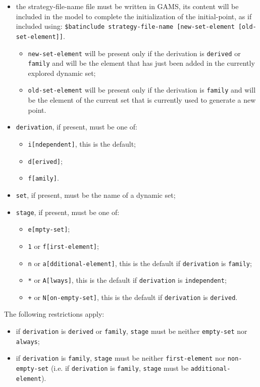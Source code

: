 \begin{itemize}
\item the strategy-file-name file must be written in GAMS, its content will be
  included in the model to complete the initialization of the initial-point, as
  if included using:
  \texttt{\$batinclude strategy-file-name [new-set-element [old-set-element]]}.
  \begin{itemize}
  \item \texttt{new-set-element} will be present only if the derivation is
    \texttt{derived} or \texttt{family} and will be the element that has just
    been added in the currently explored dynamic set;
  \item \texttt{old-set-element} will be present only if the derivation is
    \texttt{family} and will be the element of the current set that is currently
    used to generate a new point.
  \end{itemize}
\item \texttt{derivation}, if present, must be one of:
  \begin{itemize}
  \item \texttt{i[ndependent]}, this is the default;
  \item \texttt{d[erived]};
  \item \texttt{f[amily]}.
  \end{itemize}
\item \texttt{set}, if present, must be the name of a dynamic set;
\item \texttt{stage}, if present, must be one of:
  \begin{itemize}
  \item \texttt{e[mpty-set]};
  \item \texttt{1} or \texttt{f[irst-element]};
  \item \texttt{n} or \texttt{a[dditional-element]}, this is the default if
    \texttt{derivation} is \texttt{family};
  \item \texttt{*} or \texttt{A[lways]}, this is the default if
    \texttt{derivation} is \texttt{independent};
  \item \texttt{+} or \texttt{N[on-empty-set]}, this is the default if
    \texttt{derivation} is \texttt{derived}.
  \end{itemize}
\end{itemize}

The following restrictions apply:
\begin{itemize}
\item if \texttt{derivation} is \texttt{derived} or \texttt{family},
  \texttt{stage} must be neither \texttt{empty-set} nor \texttt{always};
\item if \texttt{derivation} is \texttt{family}, \texttt{stage} must be neither
  \texttt{first-element} nor \texttt{non-empty-set} (i.e. if \texttt{derivation}
  is \texttt{family}, \texttt{stage} must be \texttt{additional-element}).
\end{itemize}

